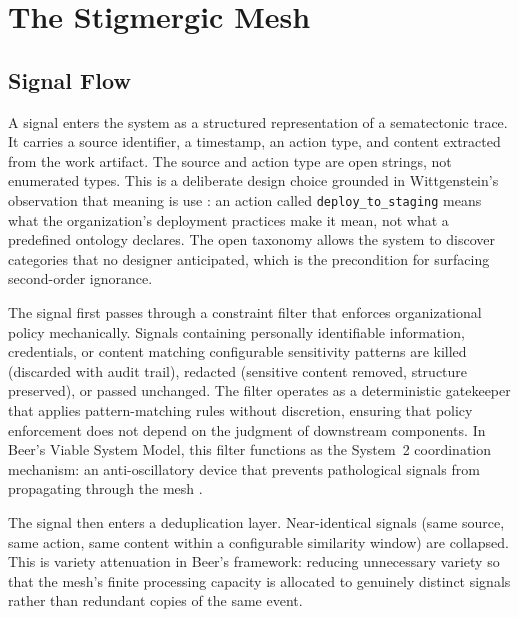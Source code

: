 \documentclass[11pt,a4paper]{article}
\begin{document}
\section{The Stigmergic Mesh}
\label{sec:mesh}

\subsection{Signal Flow}
\label{sec:signal-flow}

A signal enters the system as a structured representation of a sematectonic trace. It carries a source identifier, a timestamp, an action type, and content extracted from the work artifact. The source and action type are open strings, not enumerated types. This is a deliberate design choice grounded in Wittgenstein's observation that meaning is use \citep{wittgenstein1953}: an action called \texttt{deploy\_to\_staging} means what the organization's deployment practices make it mean, not what a predefined ontology declares. The open taxonomy allows the system to discover categories that no designer anticipated, which is the precondition for surfacing second-order ignorance.

The signal first passes through a constraint filter that enforces organizational policy mechanically. Signals containing personally identifiable information, credentials, or content matching configurable sensitivity patterns are killed (discarded with audit trail), redacted (sensitive content removed, structure preserved), or passed unchanged. The filter operates as a deterministic gatekeeper that applies pattern-matching rules without discretion, ensuring that policy enforcement does not depend on the judgment of downstream components. In Beer's Viable System Model, this filter functions as the System~2 coordination mechanism: an anti-oscillatory device that prevents pathological signals from propagating through the mesh \citep{beer1972}.

The signal then enters a deduplication layer. Near-identical signals (same source, same action, same content within a configurable similarity window) are collapsed. This is variety attenuation in Beer's framework: reducing unnecessary variety so that the mesh's finite processing capacity is allocated to genuinely distinct signals rather than redundant copies of the same event.


\end{document}

